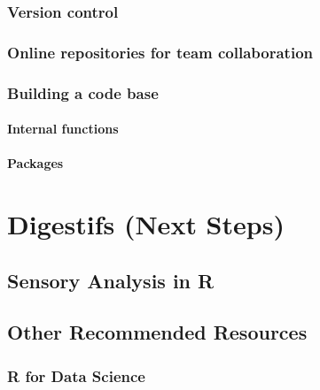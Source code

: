 \documentclass[
]{book}
\begin{document}
\hypertarget{version-control}{%
\subsection{Version control}\label{version-control}}

\hypertarget{online-repositories-for-team-collaboration}{%
\subsection{Online repositories for team collaboration}\label{online-repositories-for-team-collaboration}}

\hypertarget{building-a-code-base}{%
\subsection{Building a code base}\label{building-a-code-base}}

\hypertarget{internal-functions}{%
\subsubsection{Internal functions}\label{internal-functions}}

\hypertarget{packages}{%
\subsubsection{Packages}\label{packages}}

\hypertarget{next-steps}{%
\chapter{Digestifs (Next Steps)}\label{next-steps}}

\hypertarget{sensory-analysis-in-r}{%
\section{Sensory Analysis in R}\label{sensory-analysis-in-r}}

\hypertarget{other-recommended-resources}{%
\section{Other Recommended Resources}\label{other-recommended-resources}}

\hypertarget{r-for-data-science}{%
\subsection{R for Data Science}\label{r-for-data-science}}
\end{document}
